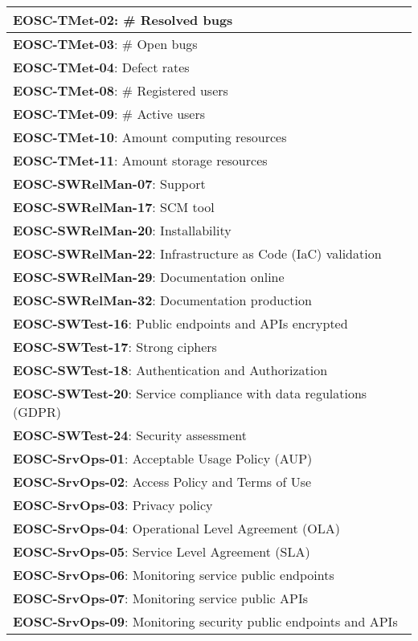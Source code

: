 \begin{center}
    \tablehead{\hline}
    \tabletail{\hline}
    \label{tab:rs_serviceprod}
    \small
    \begin{supertabular}{|p{\linewidth}|}
    \textbf{EOSC-TMet-02}: \# Resolved bugs \\ \hline
    \textbf{EOSC-TMet-03}: \# Open bugs \\ \hline
    \textbf{EOSC-TMet-04}: Defect rates \\ \hline
    \textbf{EOSC-TMet-08}: \# Registered users \\ \hline
    \textbf{EOSC-TMet-09}: \# Active users \\ \hline
    \textbf{EOSC-TMet-10}: Amount computing resources \\ \hline
    \textbf{EOSC-TMet-11}: Amount storage resources \\ \hline
    \textbf{EOSC-SWRelMan-07}: Support \\ \hline
    \textbf{EOSC-SWRelMan-17}: SCM tool \\ \hline
    \textbf{EOSC-SWRelMan-20}: Installability \\ \hline
    \textbf{EOSC-SWRelMan-22}: Infrastructure as Code (IaC) validation \\ \hline
    \textbf{EOSC-SWRelMan-29}: Documentation online \\ \hline
    \textbf{EOSC-SWRelMan-32}: Documentation production \\ \hline
    \textbf{EOSC-SWTest-16}: Public endpoints and APIs encrypted \\ \hline
    \textbf{EOSC-SWTest-17}: Strong ciphers \\ \hline
    \textbf{EOSC-SWTest-18}: Authentication and Authorization \\ \hline
    \textbf{EOSC-SWTest-20}: Service compliance with data regulations (GDPR) \\ \hline
    \textbf{EOSC-SWTest-24}: Security assessment \\ \hline
    \textbf{EOSC-SrvOps-01}: Acceptable Usage Policy (AUP) \\ \hline
    \textbf{EOSC-SrvOps-02}: Access Policy and Terms of Use \\ \hline
    \textbf{EOSC-SrvOps-03}: Privacy policy \\ \hline
    \textbf{EOSC-SrvOps-04}: Operational Level Agreement (OLA) \\ \hline
    \textbf{EOSC-SrvOps-05}: Service Level Agreement (SLA) \\ \hline
    \textbf{EOSC-SrvOps-06}: Monitoring service public endpoints \\ \hline
    \textbf{EOSC-SrvOps-07}: Monitoring service public APIs \\ \hline
    \textbf{EOSC-SrvOps-09}: Monitoring security public endpoints and APIs \\ \hline
\end{supertabular}
\end{center}

